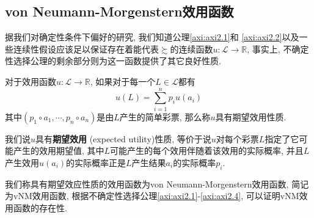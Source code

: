 \documentclass[cn, 12pt, math=mtpro2, bibstyle=apa, blue]{elegantbook}
\newcommand{\R}{\mathbb{R}}
\begin{document}
\subsection{von Neumann-Morgenstern效用函数}
据我们对确定性条件下偏好的研究, 我们知道公理\ref{axi:axi2.1}和 \ref{axi:axi2.2}以及一些连续性假设应该足以保证存在着能代表$\succsim$的连续函数$u:\mathscr{L}\to\R$, 事实上, 不确定性选择公理的剩余部分则为这一函数提供了其它良好性质.
\begin{definition}
对于效用函数$u:\mathscr{L}\to\R$, 如果对于每一个$L\in\mathscr{L}$都有
$$u(L)=\sum_{i=1}^{n}p_iu(a_i)$$
其中$(p_1\circ a_1,\cdots,p_n\circ a_n)$是由$L$产生的简单彩票, 那么称$u$具有期望效用性质.
\end{definition}
我们说$u$具有\textbf{期望效用} (expected utility)性质, 等价于说$u$对每个彩票$L$指定了它可能产生的效用期望值, 其中$L$可能产生的每个效用伴随着该效用的实际概率, 并且$L$产生效用$u(a_i)$的实际概率正是$L$产生结果$a_i$的实际概率$p_i$.

我们称具有期望效应性质的效用函数为von Neumann-Morgenstern效用函数, 简记为vNM效用函数, 根据不确定性选择公理\ref{axi:axi2.1}-\ref{axi:axi2.4}, 可以证明vNM效用函数的存在性.
\end{document}
